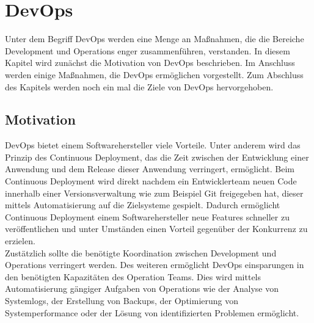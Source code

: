 \chapter{DevOps}
Unter dem Begriff DevOps werden eine Menge an Maßnahmen, die die Bereiche Development und Operations enger zusammenführen, verstanden. In diesem Kapitel wird zunächst die Motivation von DevOps beschrieben. Im Anschluss werden einige Maßnahmen, die DevOps ermöglichen vorgestellt. Zum Abschluss des Kapitels werden noch ein mal die Ziele von DevOps hervorgehoben.

\section{Motivation}
DevOps bietet einem Softwarehersteller viele Vorteile. Unter anderem wird das  Prinzip des Continuous Deployment, das die Zeit zwischen der Entwicklung einer Anwendung und dem Release dieser Anwendung verringert, ermöglicht. Beim Continuous Deployment wird direkt nachdem ein Entwicklerteam neuen Code innerhalb einer Versionsverwaltung wie zum Beispiel Git freigegeben hat, dieser mittels Automatisierung auf die Zielsysteme gespielt. Dadurch ermöglicht Continuous Deployment einem Softwarehersteller neue Features schneller zu veröffentlichen und unter Umständen einen Vorteil gegenüber der Konkurrenz zu erzielen.\\
Zustätzlich sollte die benötigte Koordination zwischen Development und Operations verringert werden. Des weiteren ermöglicht DevOps einsparungen in den benötigten Kapazitäten des Operation Teams. Dies wird mittels Automatisierung gängiger Aufgaben von Operations wie der Analyse von Systemlogs, der Erstellung von Backups, der Optimierung von Systemperformance oder der Lösung von identifizierten Problemen ermöglicht.

